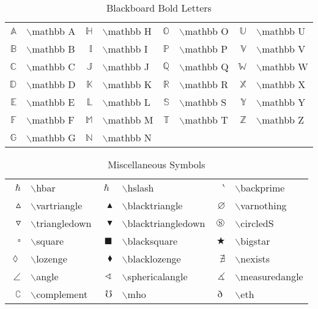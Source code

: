 \begin{table}
\centering
\caption{Blackboard Bold Letters}
\vspace{\baselineskip}
\tablerule
\begin{tabular}{rlrlrlrl}
$\mathbb A$&$\backslash$mathbb A&
$\mathbb H$&$\backslash$mathbb H&
$\mathbb O$&$\backslash$mathbb O&
$\mathbb U$&$\backslash$mathbb U\\
$\mathbb B$&$\backslash$mathbb B&
$\mathbb I$&$\backslash$mathbb I&
$\mathbb P$&$\backslash$mathbb P&
$\mathbb V$&$\backslash$mathbb V\\
$\mathbb C$&$\backslash$mathbb C&
$\mathbb J$&$\backslash$mathbb J&
$\mathbb Q$&$\backslash$mathbb Q&
$\mathbb W$&$\backslash$mathbb W\\
$\mathbb D$&$\backslash$mathbb D&
$\mathbb K$&$\backslash$mathbb K&
$\mathbb R$&$\backslash$mathbb R&
$\mathbb X$&$\backslash$mathbb X\\
$\mathbb E$&$\backslash$mathbb E&
$\mathbb L$&$\backslash$mathbb L&
$\mathbb S$&$\backslash$mathbb S&
$\mathbb Y$&$\backslash$mathbb Y\\
$\mathbb F$&$\backslash$mathbb F&
$\mathbb M$&$\backslash$mathbb M&
$\mathbb T$&$\backslash$mathbb T&
$\mathbb Z$&$\backslash$mathbb Z\\
$\mathbb G$&$\backslash$mathbb G&
$\mathbb N$&$\backslash$mathbb N&&
\end{tabular}
\tablerule
\end{table}
 
\begin{table}
\centering
\caption{Miscellaneous Symbols}\label{tab:amsmisc}
\vspace{\baselineskip}
\tablerule
\begin{tabular}{rlrlrl}
$\hbar$&$\backslash$hbar&
$\hslash$&$\backslash$hslash&
$\backprime$&$\backslash$backprime\\
$\vartriangle$&$\backslash$vartriangle&
$\blacktriangle$&$\backslash$blacktriangle&
$\varnothing$&$\backslash$varnothing\\
$\triangledown$&$\backslash$triangledown&
$\blacktriangledown$&$\backslash$blacktriangledown&
$\circledS$&$\backslash$circledS\\
$\square$&$\backslash$square&
$\blacksquare$&$\backslash$blacksquare&
$\bigstar$&$\backslash$bigstar\\
$\lozenge$&$\backslash$lozenge&
$\blacklozenge$&$\backslash$blacklozenge&
$\nexists$&$\backslash$nexists\\
$\angle$&$\backslash$angle&
$\sphericalangle$&$\backslash$sphericalangle&
$\measuredangle$&$\backslash$measuredangle\\
$\complement$&$\backslash$complement&
$\mho$&$\backslash$mho&
$\eth$&$\backslash$eth\\
\end{tabular}
\tablerule
\end{table}
 
